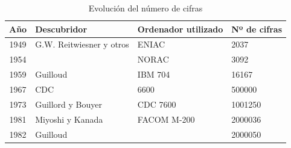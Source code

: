 \documentclass[spanish,a4paper,11pt]{article}
\begin{document}
\begin{table}[!ht]
\begin{center}
\begin{tabular}{|c|l|l|l|}
\hline
Año & Descubridor & Ordenador utilizado & Nº de cifras \\ \hline
1949 & G.W. Reitwiesner y otros & ENIAC & 2037 \\ \hline
1954 & & NORAC & 3092 \\ \hline
1959 & Guilloud & IBM 704 & 16167 \\ \hline
1967 & CDC & 6600 & 500000 \\ \hline
1973 & Guillord y Bouyer & CDC 7600 & 1001250 \\ \hline
1981 & Miyoshi y Kanada & FACOM M-200 & 2000036 \\ \hline
1982 & Guilloud & &	2000050 \\ \hline
\end{tabular}
\end{center}
\caption{Evolución del número de cifras}
\label{tiempo}
\end{table}
















\end{document}
